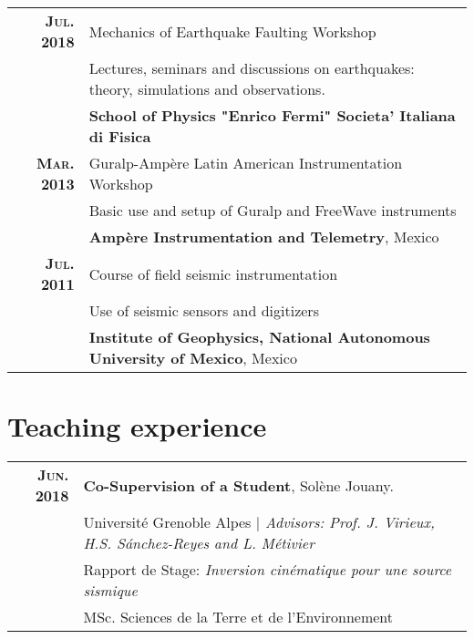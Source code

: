 \documentclass[a4paper,10.5pt]{article} %
\begin{document}
\begin{tabular}{rl}
{\bf \textsc{Jul.} 2018} & Mechanics of Earthquake Faulting Workshop \\
& Lectures, seminars and discussions on earthquakes: theory, simulations and observations. \\
& \small\textbf{School of Physics "Enrico Fermi" Societa' Italiana di Fisica}\\[0.6em]

{\bf \textsc{Mar.} 2013} & Guralp-Amp\`ere Latin American Instrumentation Workshop\\
& Basic use and setup of Guralp and FreeWave instruments\\
& \small\textbf{Amp\`ere Instrumentation and Telemetry}, Mexico\\[0.6em]

{\bf \textsc{Jul.} 2011} & Course of field seismic instrumentation\\
& Use of seismic sensors and digitizers\\
& \small\textbf{Institute of Geophysics, National Autonomous University of Mexico}, Mexico
\end{tabular}

\vskip 0.5cm
\section{Teaching experience}

\begin{tabular}{rl}	
{\bf \textsc{Jun. 2018}} & {\bf Co-Supervision of a Student}, Sol\`ene Jouany. \\
& \small{Universit\'e Grenoble Alpes} \emph{ $|$ \small Advisors: Prof. J. Virieux, H.S. S\'anchez-Reyes and L. M\'etivier} \\
& Rapport de Stage: \emph{Inversion cin\'ematique pour une source sismique} \\
& MSc. Sciences de la Terre et de l'Environnement
\end{tabular}


\vskip 0.2cm
\end{document}
